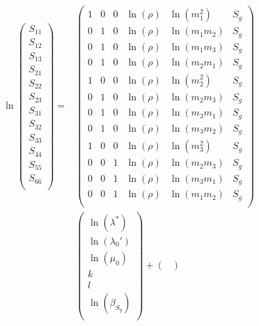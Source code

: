 \documentclass[a4paper,fleqn]{DC_ArtStyle}
\begin{document}
\begin{equation}
	\begin{split}
		\ln
		\begin{pmatrix}
			S_{11} \\
			S_{12} \\
			S_{13} \\
			S_{21} \\
			S_{22} \\
			S_{23} \\
			S_{31} \\
			S_{32} \\
			S_{33} \\
			S_{44} \\
			S_{55} \\
			S_{66} \\
		\end{pmatrix} = &\begin{pmatrix}
			1 & 0 & 0 & \ln(\rho) & \ln(m_1^2) & S_g \\
			0 & 1 & 0 & \ln(\rho) & \ln(m_1 m_2) & S_g \\
			0 & 1 & 0 & \ln(\rho) & \ln(m_1 m_3) & S_g \\
			0 & 1 & 0 & \ln(\rho) & \ln(m_2 m_1) & S_g \\
			1 & 0 & 0 & \ln(\rho) & \ln(m_2^2) & S_g \\
			0 & 1 & 0 & \ln(\rho) & \ln(m_2 m_3) & S_g \\
			0 & 1 & 0 & \ln(\rho) & \ln(m_3 m_1) & S_g \\
			0 & 1 & 0 & \ln(\rho) & \ln(m_3 m_2) & S_g \\
			1 & 0 & 0 & \ln(\rho) & \ln(m_3^2) & S_g \\
			0 & 0 & 1 & \ln(\rho) & \ln(m_2 m_3) & S_g \\
			0 & 0 & 1 & \ln(\rho) & \ln(m_3 m_1) & S_g \\
			0 & 0 & 1 & \ln(\rho) & \ln(m_1 m_2) & S_g \\
		\end{pmatrix} \\ & \begin{pmatrix}
			\ln(\lambda^{*}) \\
			\ln(\lambda_0') \\
			\ln(\mu_0) \\
			k \\
			l \\
			\ln(\beta_{S_g})\\
		\end{pmatrix} + \begin{pmatrix}

\end{pmatrix}
\end{split}
\end{equation}
\end{document}
